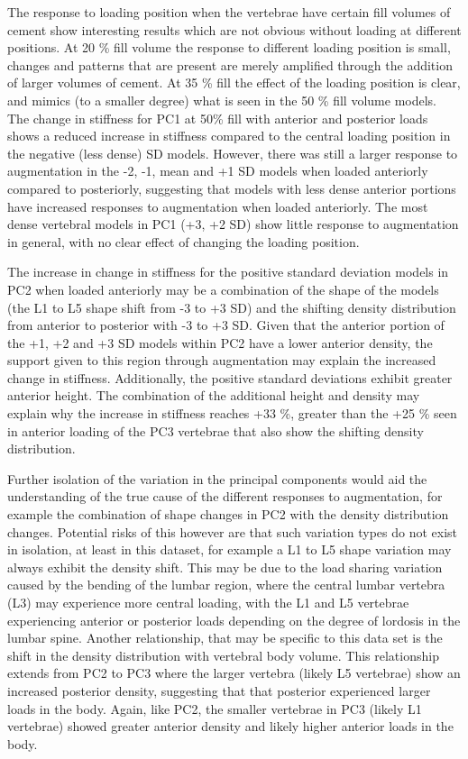 The response to loading position when the vertebrae have certain fill volumes of cement show interesting results which are not obvious without loading at different positions.
At 20 \% fill volume the response to different loading position is small, changes and patterns that are present are merely amplified through the addition of larger volumes of cement.
At 35 \% fill the effect of the loading position is clear, and mimics (to a smaller degree) what is seen in the 50 \% fill volume models.
The change in stiffness for PC1 at 50\% fill with anterior and posterior loads shows a reduced increase in stiffness compared to the central loading position in the negative (less dense) SD models.
However, there was still a larger response to augmentation in the -2, -1, mean and +1 SD models when loaded anteriorly compared to posteriorly, suggesting that models with less dense anterior portions have increased responses to augmentation when loaded anteriorly.
The most dense vertebral models in PC1 (+3, +2 SD) show little response to augmentation in general, with no clear effect of changing the loading position.

The increase in change in stiffness for the positive standard deviation models in PC2 when loaded anteriorly may be a combination of the shape of the models (the L1 to L5 shape shift from -3 to +3 SD) and the shifting density distribution from anterior to posterior with -3 to +3 SD.
Given that the anterior portion of the +1, +2 and +3 SD models within PC2 have a lower anterior density, the support given to this region through augmentation may explain the increased change in stiffness.
Additionally, the positive standard deviations exhibit greater anterior height.
The combination of the additional height and density may explain why the increase in stiffness reaches +33 \%, greater than the +25 \% seen in anterior loading of the PC3 vertebrae that also show the shifting density distribution.

Further isolation of the variation in the principal components would aid the understanding of the true cause of the different responses to augmentation, for example the combination of shape changes in PC2 with the density distribution changes.
Potential risks of this however are that such variation types do not exist in isolation, at least in this dataset, for example a L1 to L5 shape variation may always exhibit the density shift.
This may be due to the load sharing variation caused by the bending of the lumbar region, where the central lumbar vertebra (L3) may experience more central loading, with the L1 and L5 vertebrae experiencing anterior or posterior loads depending on the degree of lordosis in the lumbar spine.
Another relationship, that may be specific to this data set is the shift in the density distribution with vertebral body volume.
This relationship extends from PC2 to PC3 where the larger vertebra (likely L5 vertebrae) show an increased posterior density, suggesting that that posterior experienced larger loads in the body.
Again, like PC2, the smaller vertebrae in PC3 (likely L1 vertebrae) showed greater anterior density and likely higher anterior loads in the body.
